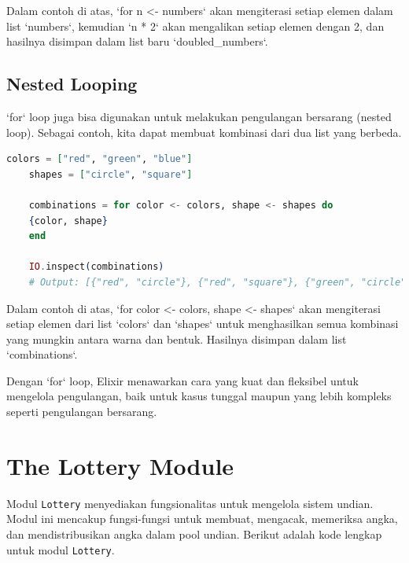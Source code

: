 Dalam contoh di atas, `for n <- numbers` akan mengiterasi setiap elemen dalam list `numbers`, kemudian `n * 2` akan mengalikan setiap elemen dengan 2, dan hasilnya disimpan dalam list baru `doubled\_numbers`.

\subsection{Nested Looping}

`for` loop juga bisa digunakan untuk melakukan pengulangan bersarang (nested loop). Sebagai contoh, kita dapat membuat kombinasi dari dua list yang berbeda.

\begin{lstlisting}[language=Elixir]
	colors = ["red", "green", "blue"]
	shapes = ["circle", "square"]
	
	combinations = for color <- colors, shape <- shapes do
	{color, shape}
	end
	
	IO.inspect(combinations)
	# Output: [{"red", "circle"}, {"red", "square"}, {"green", "circle"}, {"green", "square"}, {"blue", "circle"}, {"blue", "square"}]
\end{lstlisting}

Dalam contoh di atas, `for color <- colors, shape <- shapes` akan mengiterasi setiap elemen dari list `colors` dan `shapes` untuk menghasilkan semua kombinasi yang mungkin antara warna dan bentuk. Hasilnya disimpan dalam list `combinations`.

Dengan `for` loop, Elixir menawarkan cara yang kuat dan fleksibel untuk mengelola pengulangan, baik untuk kasus tunggal maupun yang lebih kompleks seperti pengulangan bersarang.

\section{The Lottery Module}

Modul \texttt{Lottery} menyediakan fungsionalitas untuk mengelola sistem undian. Modul ini mencakup fungsi-fungsi untuk membuat, mengacak, memeriksa angka, dan mendistribusikan angka dalam pool undian. Berikut adalah kode lengkap untuk modul \texttt{Lottery}.

